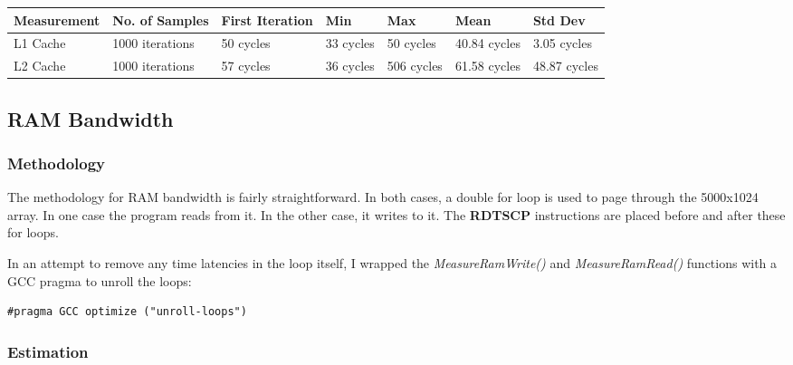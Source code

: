 \documentclass[paper=a4, fontsize=11pt]{scrartcl}
\numberwithin{equation}{section}        %
\numberwithin{figure}{section}          %
\numberwithin{table}{section}               %
\begin{document}
\begin{center}
    \begin{tabular}{ | l | l | l | l | l | l | l |}
    \hline
    Measurement & No. of Samples & First Iteration & Min & Max & Mean & Std Dev \\
    \hline
    L1 Cache & 1000 iterations & 50 cycles & 33 cycles & 50 cycles & 40.84 cycles & 3.05  cycles \\ 
    L2 Cache & 1000 iterations & 57 cycles & 36 cycles & 506 cycles & 61.58 cycles & 48.87  cycles \\ 
    \hline
    \end{tabular}
\end{center}


\subsection{RAM Bandwidth}

\subsubsection{Methodology}

The methodology for RAM bandwidth is fairly straightforward.  In both cases, a double for loop is used to page through the 5000x1024 array.  In one case the program reads from it.  In the other case, it writes to it.  The \textbf{RDTSCP} instructions are placed before and after these for loops.

In an attempt to remove any time latencies in the loop itself, I wrapped the \textit{MeasureRamWrite()} and \textit{MeasureRamRead()} functions with a GCC pragma to unroll the loops:

\lstset{language=C}
\begin{lstlisting}
#pragma GCC optimize ("unroll-loops")
\end{lstlisting}

\subsubsection{Estimation}

















































\end{document}
